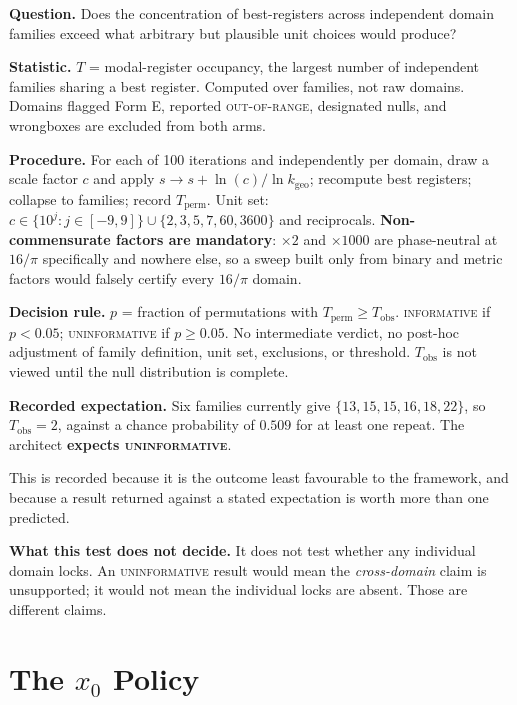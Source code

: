 \documentclass[11pt, letterpaper, openany]{book}
\newcommand{\kgeo}{k_{\mathrm{geo}}}
\begin{document}
\begin{predictionbox}
\textbf{Question.} Does the concentration of best-registers across independent domain families
exceed what arbitrary but plausible unit choices would produce?

\medskip
\textbf{Statistic.} $T$ = modal-register occupancy, the largest number of independent families
sharing a best register. Computed over families, not raw domains. Domains flagged Form E,
reported \textsc{out-of-range}, designated nulls, and wrongboxes are excluded from both arms.

\medskip
\textbf{Procedure.} For each of 100 iterations and independently per domain, draw a scale factor
$c$ and apply $s \to s + \ln(c)/\ln \kgeo$; recompute best registers; collapse to families;
record $T_{\text{perm}}$. Unit set:
$c \in \{10^{j}: j \in [-9,9]\} \cup \{2, 3, 5, 7, 60, 3600\}$ and reciprocals.
\textbf{Non-commensurate factors are mandatory}: $\times 2$ and $\times 1000$ are phase-neutral
at $16/\pi$ specifically and nowhere else, so a sweep built only from binary and metric factors
would falsely certify every $16/\pi$ domain.

\medskip
\textbf{Decision rule.} $p$ = fraction of permutations with $T_{\text{perm}} \geq T_{\text{obs}}$.
\textsc{informative} if $p < 0.05$; \textsc{uninformative} if $p \geq 0.05$. No intermediate
verdict, no post-hoc adjustment of family definition, unit set, exclusions, or threshold.
$T_{\text{obs}}$ is not viewed until the null distribution is complete.
\end{predictionbox}

\begin{warningbox}
\textbf{Recorded expectation.} Six families currently give $\{13,15,15,16,18,22\}$, so
$T_{\text{obs}} = 2$, against a chance probability of $0.509$ for at least one repeat. The
architect \textbf{expects \textsc{uninformative}}.

\medskip
\noindent This is recorded because it is the outcome least favourable to the framework, and
because a result returned against a stated expectation is worth more than one predicted.

\medskip
\noindent \textbf{What this test does not decide.} It does not test whether any individual
domain locks. An \textsc{uninformative} result would mean the \emph{cross-domain} claim is
unsupported; it would not mean the individual locks are absent. Those are different claims.
\end{warningbox}

\section{The $x_0$ Policy}
\end{document}
